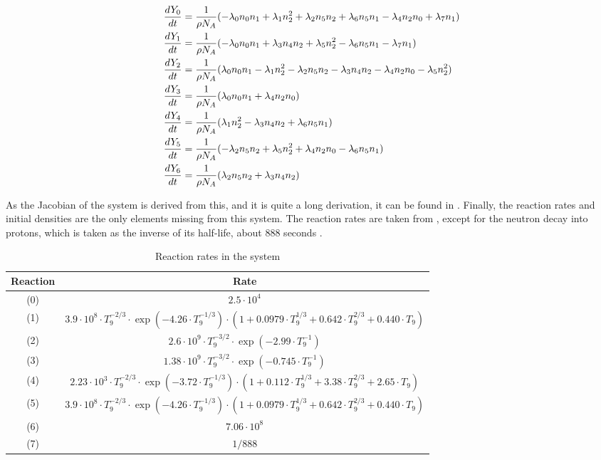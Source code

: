 \documentclass[a4paper, 12pt]{article}
\begin{document}
\begin{equation}
    \label{eq:sys}
    \centering
    \begin{split}
        \frac{dY_0}{dt} &= \frac{1}{\rho N_A}(-\lambda_0n_0n_1 + \lambda_1n_2^2 + \lambda_2n_5n_2 + \lambda_6n_5n_1 - \lambda_4n_2n_0 + \lambda_7n_1)\\
        \frac{dY_1}{dt} &= \frac{1}{\rho N_A}(-\lambda_0n_0n_1 + \lambda_3n_4n_2 + \lambda_5n_2^2 - \lambda_6n_5n_1 - \lambda_7n_1)\\
        \frac{dY_2}{dt} &= \frac{1}{\rho N_A}(\lambda_0n_0n_1 - \lambda_1n_2^2 - \lambda_2n_5n_2 - \lambda_3n_4n_2 - \lambda_4n_2n_0 - \lambda_5n_2^2)\\
        \frac{dY_3}{dt} &= \frac{1}{\rho N_A}(\lambda_0n_0n_1 + \lambda_4n_2n_0)\\
        \frac{dY_4}{dt} &= \frac{1}{\rho N_A}(\lambda_1n^2_2 - \lambda_3n_4n_2 + \lambda_6n_5n_1)\\
        \frac{dY_5}{dt} &= \frac{1}{\rho N_A}(-\lambda_2n_5n_2 + \lambda_5n^2_2 + \lambda_4n_2n_0 - \lambda_6n_5n_1)\\
        \frac{dY_6}{dt} &= \frac{1}{\rho N_A}(\lambda_2n_5n_2 + \lambda_3n_4n_2)\\
    \end{split}
\end{equation}

As the Jacobian of the system is derived from this, and it is quite a long derivation, it can be found in . Finally, the reaction rates and initial densities are the only elements missing from this system. The reaction rates are taken from \cite{wagoner_synthesis_1967}, except for the neutron decay into protons, which is taken as the inverse of its half-life, about 888 seconds \parencite{navas_review_2024}. 
\begin{table}[hb!]
    \begin{tabular}{c|c}
    Reaction & Rate\\
    \hline
    (0) & $2.5\cdot10^4$\\
    (1) & $3.9\cdot10^8 \cdot T_9^{-2/3} \cdot \exp(-4.26\cdot T_9^{-1/3}) \cdot (1 + 0.0979 \cdot T_9^{1/3} + 0.642 \cdot T_9^{2/3} + 0.440 \cdot T_9)$\\
    (2) & $2.6\cdot10^9 \cdot T_9^{-3/2} \cdot \exp(-2.99\cdot T_9^{-1})$\\
    (3) & $1.38\cdot10^9 \cdot T_9^{-3/2} \cdot \exp(-0.745\cdot T_9^{-1})$\\
    (4) & $2.23\cdot 10^3 \cdot T_9^{-2/3} \cdot \exp(-3.72\cdot T_9^{-1/3}) \cdot (1 + 0.112\cdot T_9^{1/3} + 3.38\cdot T_9^{2/3} + 2.65\cdot T_9)$\\
    (5) & $3.9\cdot10^8 \cdot T_9^{-2/3} \cdot \exp(-4.26\cdot T_9^{-1/3}) \cdot (1 + 0.0979 \cdot T_9^{1/3} + 0.642 \cdot T_9^{2/3} + 0.440 \cdot T_9)$\\
    (6) & $7.06\cdot10^8$\\
    (7) & $1/888$\\
\end{tabular}
\caption{Reaction rates in the system}
\label{tab:rates}
\end{table}
\end{document}
